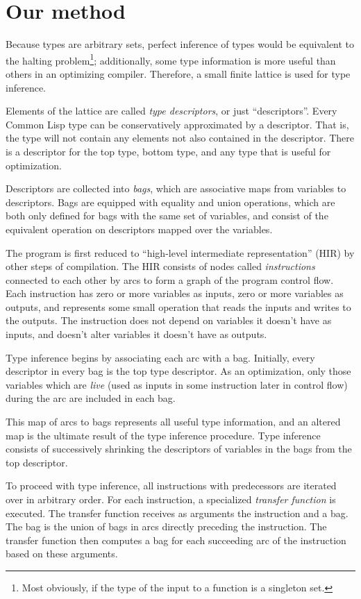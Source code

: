 \section{Our method}

Because \commonlisp{} types are arbitrary sets, perfect inference of \commonlisp{} types would be equivalent to the halting problem\footnote{Most obviously, if the type of the input to a function is a singleton set.}; additionally, some type information is more useful than others in an optimizing compiler. Therefore, a small finite lattice is used for type inference.

Elements of the lattice are called \textit{type descriptors}, or just ``descriptors''. Every Common Lisp type can be conservatively approximated by a descriptor. That is, the type will not contain any elements not also contained in the descriptor. There is a descriptor for the top type, bottom type, and any type that is useful for optimization.

Descriptors are collected into \textit{bags}, which are associative maps from variables to descriptors. Bags are equipped with equality and union operations, which are both only defined for bags with the same set of variables, and consist of the equivalent operation on descriptors mapped over the variables.

The program is first reduced to ``high-level intermediate representation'' (HIR) by other steps of compilation. The HIR consists of nodes called \textit{instructions} connected to each other by arcs to form a graph of the program control flow. Each instruction has zero or more variables as inputs, zero or more variables as outputs, and represents some small operation that reads the inputs and writes to the outputs. The instruction does not depend on variables it doesn't have as inputs, and doesn't alter variables it doesn't have as outputs.

Type inference begins by associating each arc with a bag. Initially, every descriptor in every bag is the top type descriptor. As an optimization, only those variables which are \textit{live} (used as inputs in some instruction later in control flow) during the arc are included in each bag.

This map of arcs to bags represents all useful type information, and an altered map is the ultimate result of the type inference procedure. Type inference consists of successively shrinking the descriptors of variables in the bags from the top descriptor.

To proceed with type inference, all instructions with predecessors are iterated over in arbitrary order. For each instruction, a specialized \textit{transfer function} is executed. The transfer function receives as arguments the instruction and a bag. The bag is the union of bags in arcs directly preceding the instruction. The transfer function then computes a bag for each succeeding arc of the instruction based on these arguments.

